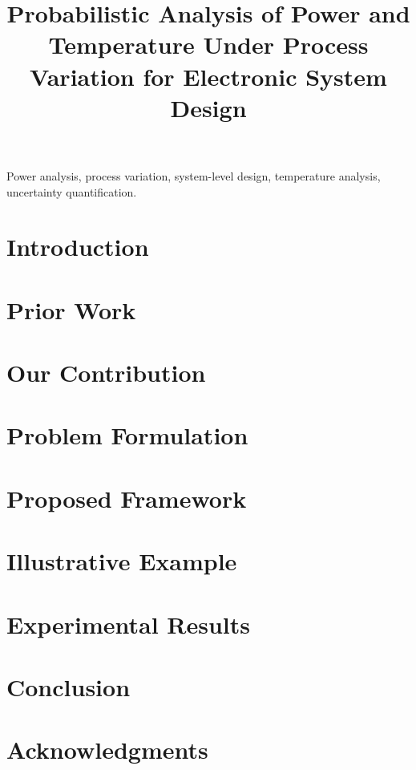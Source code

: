 \documentclass[journal]{IEEEtran}
\title{{\TitleFont Probabilistic Analysis of Power and Temperature Under Process Variation for Electronic System Design}}
\author{}
\begin{document}
  \maketitle

  \begin{abstract}
    
  \end{abstract}

  \begin{IEEEkeywords}
    Power analysis,
    process variation,
    system-level design,
    temperature analysis,
    uncertainty quantification.
  \end{IEEEkeywords}

  \section{Introduction} 
  

  \section{Prior Work} 
  

  \section{Our Contribution} 
  

  \section{Problem Formulation} 
  

  \section{Proposed Framework} 
  

  \section{Illustrative Example} 
  

  \section{Experimental Results} 
  

  \section{Conclusion} 
  

  \section*{Acknowledgments}
  

  
  

  \appendix
  
\end{document}
